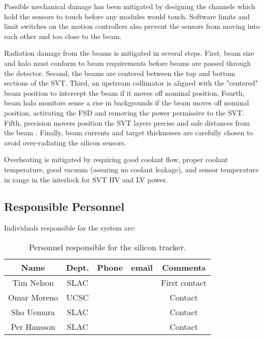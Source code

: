 Possible mechanical damage has been mitigated by designing the channels which hold the sensors to touch before any modules would touch. Software limits and  limit switches on the motion controllers also prevent the sensors from moving into each other and too close to the beam.

Radiation damage from the beams is mitigated in several steps. First, beam size and halo must conform to beam requirements before beams are passed through the detector. Second, the beams are centered between the top and bottom sections of the SVT. Third, an upstream collimator is aligned with the "centered" beam position to intercept the beam if it moves off nominal position. Fourth, beam halo monitors sense a rise in backgrounds if the beam moves off nominal position, activating the FSD and removing the power permissive to the SVT. Fifth, precision movers position the SVT layers precise and safe distances from the beam . Finally, beam currents and target thicknesses are carefully chosen to avoid over-radiating the silicon sensors.

Overheating is mitigated by requiring good coolant flow, proper coolant temperature, good vacuum (assuring no coolant leakage), and sensor temperature in range  in the interlock for SVT HV and LV power. 

\subsection{Responsible Personnel}
\indent

Individuals responsible for the system are:

 \begin{table}[!htb]
 \centering
 \begin{tabular}{|c|c|c|c|c|}
\hline
 Name&Dept.&Phone&email&Comments \\ \hline
Tim Nelson& SLAC&&& First contact \\ \hline
Omar Moreno & UCSC & && Contact \\ \hline
Sho Uemura&SLAC& && Contact \\ \hline
Per Hansson&SLAC& && Contact \\ \hline
 \end{tabular}
\caption{ Personnel responsible for the silicon tracker.} 
\label{tb:beam}
\end{table}

